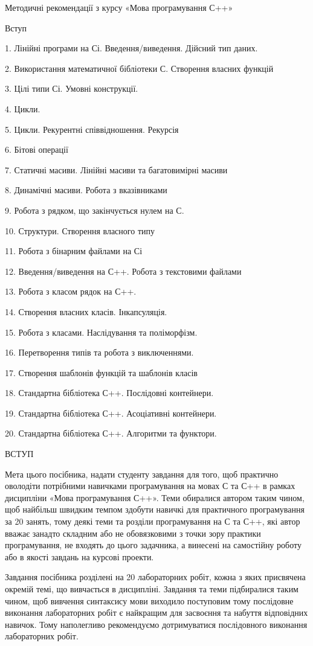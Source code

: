 \documentclass[]{article}
\date{}
\begin{document}
Методичні рекомендації з курсу «Мова програмування С++»

Вступ

1. Лінійні програми на Сі. Введення/виведення. Дійсний тип даних.

2. Використання математичної бібліотеки С. Створення власних функцій

3. Цілі типи Сі. Умовні конструкції.

4. Цикли.

5. Цикли. Рекурентні співвідношення. Рекурсія

6. Бітові операції

7. Статичні масиви. Лінійні масиви та багатовимірні масиви

8. Динамічні масиви. Робота з вказівниками

9. Робота з рядком, що закінчується нулем на С.

10. Структури. Створення власного типу

11. Робота з бінарним файлами на Сі

12. Введення/виведення на С++. Робота з текстовими файлами

13. Робота з класом рядок на С++.

14. Створення власних класів. Інкапсуляція.

15. Робота з класами. Наслідування та поліморфізм.

16. Перетворення типів та робота з виключеннями.

17. Створення шаблонів функцій та шаблонів класів

18. Стандартна бібліотека С++. Послідовні контейнери.

19. Стандартна бібліотека С++. Асоціативні контейнери.

20. Стандартна бібліотека С++. Алгоритми та функтори.

ВСТУП

Мета цього посібника, надати студенту завдання для того, щоб практично
оволодіти потрібними навичками програмування на мовах С та С++ в рамках
дисципліни «Мова програмування С++». Теми обиралися автором таким чином,
щоб найбільш швидким темпом здобути навичкі для практичного
програмування за 20 занять, тому деякі теми та розділи програмування на
С та С++, які автор вважає занадто складним або не обовязковими з точки
зору практики програмування, не входять до цього задачника, а винесені
на самостійну роботу або в якості завдань на курсові проекти.

Завдання посібника розділені на 20 лабораторних робіт, кожна з яких
присвячена окремій темі, що вивчається в дисципліні. Завдання та теми
підбиралися таким чином, щоб вивчення синтаксису мови виходило
поступовим тому послідовне виконання лабораторних робіт є найкращим для
засвоєння та набуття відповідних навичок. Тому наполегливо рекомендуємо
дотримуватися послідовного виконання лабораторних робіт.
\end{document}
